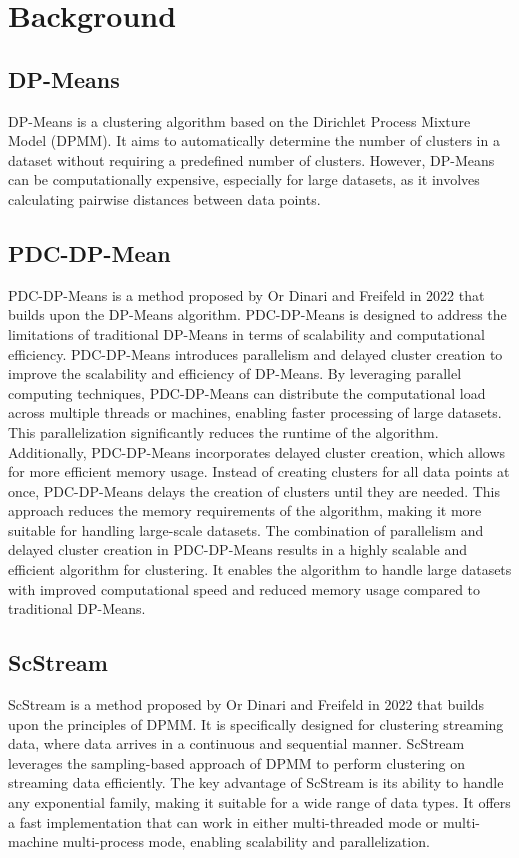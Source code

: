 \documentclass[12pt]{article}
\begin{document}
\pagebreak
    \section{Background}\label{sec:background}
        \subsection{DP-Means}\label{subsec:dpmeans}
DP-Means is a clustering algorithm based on the Dirichlet Process Mixture Model (DPMM).
It aims to automatically determine the number of clusters in a dataset without requiring a predefined number of clusters.
However, DP-Means can be computationally expensive, especially for large datasets, as it involves calculating pairwise distances between data points.
        \subsection{PDC-DP-Mean}\label{subsec:pdc}
PDC-DP-Means is a method proposed by Or Dinari and Freifeld in 2022 that builds upon the DP-Means algorithm.
PDC-DP-Means is designed to address the limitations of traditional DP-Means in terms of scalability and computational efficiency.
PDC-DP-Means introduces parallelism and delayed cluster creation to improve the scalability and efficiency of DP-Means.
By leveraging parallel computing techniques, PDC-DP-Means can distribute the computational load across multiple threads or machines, enabling faster processing of large datasets.
This parallelization significantly reduces the runtime of the algorithm.
Additionally, PDC-DP-Means incorporates delayed cluster creation, which allows for more efficient memory usage.
Instead of creating clusters for all data points at once, PDC-DP-Means delays the creation of clusters until they are needed.
This approach reduces the memory requirements of the algorithm, making it more suitable for handling large-scale datasets.
The combination of parallelism and delayed cluster creation in PDC-DP-Means results in a highly scalable and efficient algorithm for clustering.
It enables the algorithm to handle large datasets with improved computational speed and reduced memory usage compared to traditional DP-Means.
        \subsection{ScStream}\label{subsec:scstream}
ScStream is a method proposed by Or Dinari and Freifeld in 2022 that builds upon the principles of DPMM.
It is specifically designed for clustering streaming data, where data arrives in a continuous and sequential manner.
ScStream leverages the sampling-based approach of DPMM to perform clustering on streaming data efficiently.
The key advantage of ScStream is its ability to handle any exponential family, making it suitable for a wide range of data types.
It offers a fast implementation that can work in either multi-threaded mode or multi-machine multi-process mode, enabling scalability and parallelization.
\pagebreak
\end{document}
